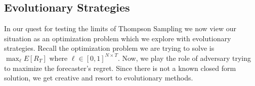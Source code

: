 \documentclass[10pt,a4paper]{article} %
\begin{document}
\begin{figure}[h!]
	\end{figure}

	
	\pagebreak
	
	\subsection{Evolutionary Strategies}	
	
	In our quest for testing the limits of Thompson Sampling we now view our situation as an optimization problem which we explore with evolutionary strategies.  Recall the optimization problem we are trying to solve is $ \max_\ell E [R_T] $ where $\ell \in \left[ 0, 1 \right]^{N \times T} $.  Now, we play the role of adversary trying to maximize the forecaster's regret.  Since there is not a known closed form solution, we get creative and resort to evolutionary methods.
		
\end{document}
